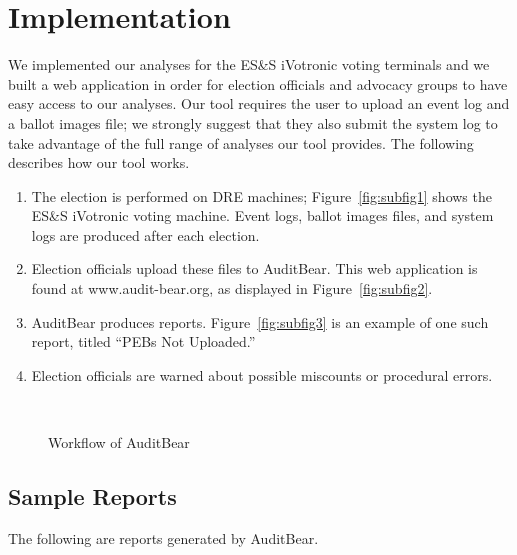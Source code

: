 \section{Implementation}
We implemented our analyses for the ES\&S iVotronic voting terminals and we built a web application in order for election officials and advocacy groups to have easy access to our analyses.  Our tool requires the user to upload an event log and a ballot images file; we strongly suggest that they also submit the system log to take advantage of the full range of analyses our tool provides.  The following describes how our tool works.  

\begin{enumerate}
\item
The election is performed on DRE machines; Figure~\ref{fig:subfig1} shows the ES\&S iVotronic voting machine.  Event logs, ballot images files, and system logs are produced after each election.
\item
Election officials upload these files to AuditBear.  This web application is found at www.audit-bear.org, as displayed in Figure~\ref{fig:subfig2}.  
\item
AuditBear produces reports.  Figure~\ref{fig:subfig3} is an example of one such report, titled \textquotedblleft PEBs Not Uploaded.\textquotedblright
\item
Election officials are warned about possible miscounts or procedural errors. 
\end{enumerate}

\begin{figure}[h]
\centering
\mbox{
}
\caption{Workflow of AuditBear}
\label{auditBear}
\end{figure}




\subsection{Sample Reports}
The following are reports generated by AuditBear.  


